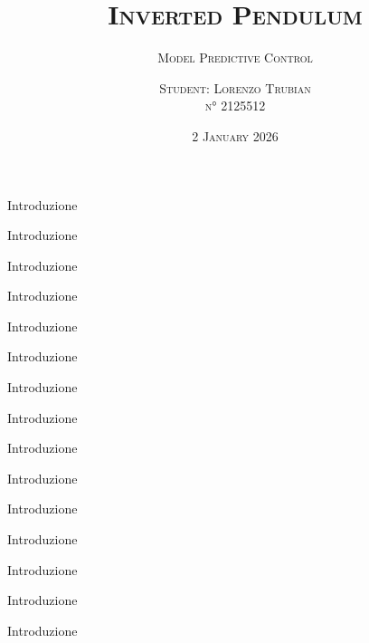 \documentclass[10pt]{beamer}
\title{\scshape{Inverted Pendulum}}
\subtitle{\fontsize{12}{12} \scshape{Model Predictive Control}\vspace{.5cm}}
\author{\fontsize{9}{9} \scshape{Student: Lorenzo Trubian\\}  \hspace{40pt} \fontsize{7}{7} \scshape{n° 2125512}\vspace{.5cm}}
\date{\fontsize{8}{8} \scshape{2 January 2026}}
\theoremstyle{definition}
\theoremstyle{definition}
\theoremstyle{definition}
\theoremstyle{plain}
\theoremstyle{plain}
\theoremstyle{plain}
\theoremstyle{definition}
\begin{document}
\maketitle


\begin{frame}{Introduzione}
\end{frame}

\begin{frame}{Introduzione}
\end{frame}

\begin{frame}{Introduzione}
\end{frame}

\begin{frame}{Introduzione}
\end{frame}

\begin{frame}{Introduzione}
\end{frame}

\begin{frame}{Introduzione}
\end{frame}

\begin{frame}{Introduzione}
\end{frame}

\begin{frame}{Introduzione}
\end{frame}

\begin{frame}{Introduzione}
\end{frame}

\begin{frame}{Introduzione}
\end{frame}

\begin{frame}{Introduzione}
\end{frame}

\begin{frame}{Introduzione}
\end{frame}

\begin{frame}{Introduzione}
\end{frame}

\begin{frame}{Introduzione}
\end{frame}

\begin{frame}{Introduzione}
\end{frame}
\end{document}
